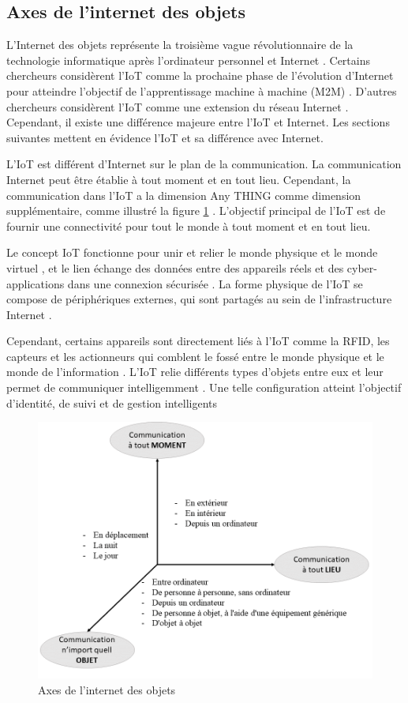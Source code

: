 \subsection{Axes de l’internet des objets}
L'Internet des objets représente la troisième vague révolutionnaire de la technologie informatique après l'ordinateur personnel et Internet \cite{4}. Certains chercheurs considèrent l'IoT comme la prochaine phase de l'évolution d'Internet pour atteindre l'objectif de l'apprentissage machine à machine (M2M) \cite{8}. D'autres chercheurs considèrent l'IoT comme une extension du réseau Internet \cite{14}. Cependant, il existe une différence majeure entre l'IoT et Internet. Les sections suivantes mettent en évidence l'IoT et sa différence avec Internet.


L'IoT est différent d'Internet sur le plan de la communication. La communication Internet peut être établie à tout moment et en tout lieu. Cependant, la communication dans l'IoT a la dimension Any THING comme dimension supplémentaire, comme illustré la figure \ref{fig2} \cite{15}. L'objectif principal de l'IoT est de fournir une connectivité pour tout le monde à tout moment et en tout lieu.


Le concept IoT fonctionne pour unir et relier le monde physique et le monde virtuel \cite{4}, et le lien échange des données entre des appareils réels et des cyber-applications dans une connexion sécurisée \cite{16}. La forme physique de l'IoT se compose de périphériques externes, qui sont partagés au sein de l'infrastructure Internet \cite{17}. 

Cependant, certains appareils sont directement liés à l'IoT comme la RFID, les capteurs et les actionneurs qui comblent le fossé entre le monde physique et le monde de l'information \cite{18}. L'IoT relie différents types d'objets entre eux et leur permet de communiquer intelligemment \cite{19}. Une telle configuration atteint l'objectif d'identité, de suivi et de gestion intelligents \cite{4}

\begin{figure}[H]
\centering
\includegraphics[scale=0.45]{chap1/Presentation2.png}
\caption{Axes de l’internet des objets \cite{10}}
\label{fig2}
\end{figure}

